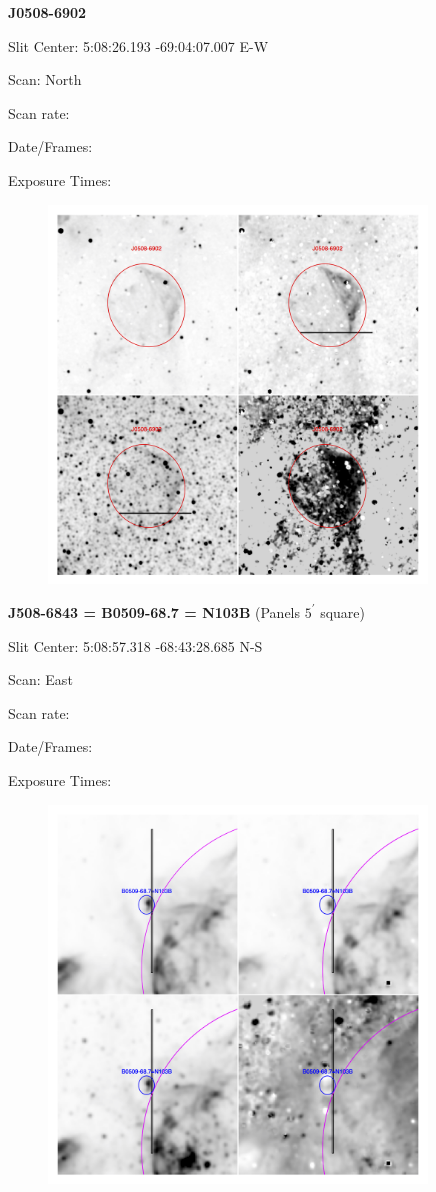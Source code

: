 \documentclass[11pt]{article}
\begin{document}
\newpage
{\bf J0508-6902}  
 
Slit Center:   5:08:26.193   -69:04:07.007     E-W

Scan:  North

Scan rate:  

Date/Frames:

Exposure Times:  

\begin{figure}
\includegraphics[width=10.05cm]{snapshots/J0508-6902.png}
\end{figure}

\newpage
{\bf J508-6843 = B0509-68.7 = N103B}  (Panels $5^\prime$ square)
 
Slit Center:   5:08:57.318   -68:43:28.685     N-S 

Scan:  East

Scan rate:  

Date/Frames:

Exposure Times:  

\begin{figure}
\includegraphics[width=10.05cm]{snapshots/N103B_5arcmin.png}
\end{figure}
\end{document}
